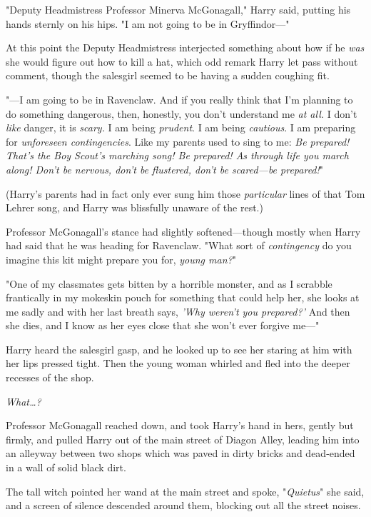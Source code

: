 "Deputy Headmistress Professor Minerva McGonagall," Harry said, putting his 
hands sternly on his hips. "I am not going to be in Gryffindor---"

At this point the Deputy Headmistress interjected something about how if he 
\emph{was} she would figure out how to kill a hat, which odd remark Harry let 
pass without comment, though the salesgirl seemed to be having a sudden 
coughing fit.

"---I am going to be in Ravenclaw. And if you really think that I'm planning to 
do something dangerous, then, honestly, you don't understand me \emph{at all.} 
I don't \emph{like} danger, it is \emph{scary.} I am being \emph{prudent}. I am 
being \emph{cautious}. I am preparing for \emph{unforeseen contingencies}. Like 
my parents used to sing to me: \emph{Be prepared! That's the Boy Scout's 
marching song! Be prepared! As through life you march along! Don't be nervous, 
don't be flustered, don't be scared---be prepared!}"

(Harry's parents had in fact only ever sung him those \emph{particular} lines 
of that Tom Lehrer song, and Harry was blissfully unaware of the rest.)

Professor McGonagall's stance had slightly softened---though mostly when Harry 
had said that he was heading for Ravenclaw. "What sort of \emph{contingency} do 
you imagine this kit might prepare you for, \emph{young man?}"

"One of my classmates gets bitten by a horrible monster, and as I scrabble 
frantically in my mokeskin pouch for something that could help her, she looks 
at me sadly and with her last breath says, \emph{'Why weren't you prepared?'} 
And then she dies, and I know as her eyes close that she won't ever forgive 
me---"

Harry heard the salesgirl gasp, and he looked up to see her staring at him with 
her lips pressed tight. Then the young woman whirled and fled into the deeper 
recesses of the shop.

\emph{What{\ldots}?}

Professor McGonagall reached down, and took Harry's hand in hers, gently but 
firmly, and pulled Harry out of the main street of Diagon Alley, leading him 
into an alleyway between two shops which was paved in dirty bricks and 
dead-ended in a wall of solid black dirt.

The tall witch pointed her wand at the main street and spoke, "\emph{Quietus}" 
she said, and a screen of silence descended around them, blocking out all the 
street noises.

